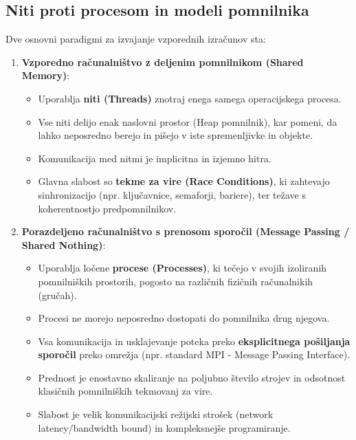 \documentclass[11pt,a4paper]{article}
\begin{document}
\subsection{Niti proti procesom in modeli pomnilnika}
Dve osnovni paradigmi za izvajanje vzporednih izračunov sta:
\begin{enumerate}
    \item \textbf{Vzporedno ra\v{c}unalni\v{s}tvo z deljenim pomnilnikom (Shared Memory)}:
    \begin{itemize}
        \item Uporablja \textbf{niti (Threads)} znotraj enega samega operacijskega procesa.
        \item Vse niti delijo enak naslovni prostor (Heap pomnilnik), kar pomeni, da lahko neposredno berejo in pi\v{s}ejo v iste spremenljivke in objekte.
        \item Komunikacija med nitmi je implicitna in izjemno hitra.
        \item Glavna slabost so \textbf{tekme za vire (Race Conditions)}, ki zahtevajo sinhronizacijo (npr. klju\v{c}avnice, semaforji, bariere), ter težave s koherentnostjo predpomnilnikov.
    \end{itemize}
    
    \item \textbf{Porazdeljeno ra\v{c}unalni\v{s}tvo s prenosom sporo\v{c}il (Message Passing / Shared Nothing)}:
    \begin{itemize}
        \item Uporablja lo\v{c}ene \textbf{procese (Processes)}, ki te\v{c}ejo v svojih izoliranih pomnilni\v{s}kih prostorih, pogosto na različnih fizi\v{c}nih računalnikih (gru\v{c}ah).
        \item Procesi ne morejo neposredno dostopati do pomnilnika drug njegova.
        \item Vsa komunikacija in usklajevanje poteka preko \textbf{eksplicitnega po\v{s}iljanja sporo\v{c}il} preko omrežja (npr. standard MPI - Message Passing Interface).
        \item Prednost je enostavno skaliranje na poljubno \v{s}tevilo strojev in odsotnost klasi\v{c}nih pomnilni\v{s}kih tekmovanj za vire.
        \item Slabost je velik komunikacijski režijski strošek (network latency/bandwidth bound) in kompleksnej\v{s}e programiranje.
    \end{itemize}
\end{enumerate}
\end{document}
